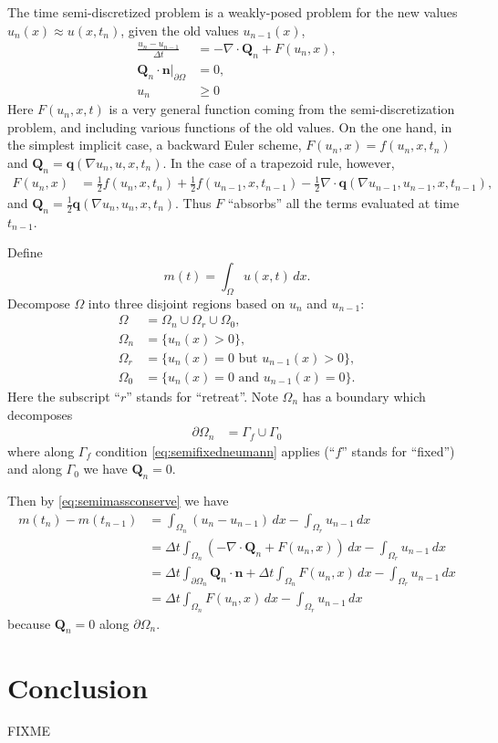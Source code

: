 \documentclass[final,leqno,onefignum,onetabnum]{siamltex1213bueler}
\newcommand\bn{\mathbf{n}}
\newcommand\bq{\mathbf{q}}
\newcommand\bQ{\mathbf{Q}}
\newcommand{\Div}{\nabla\cdot}
\renewcommand{\grad}{\nabla}
\begin{document}
The time semi-discretized problem is a weakly-posed problem for the new values $u_n(x) \approx u(x,t_n)$, given the old values $u_{n-1}(x)$,
\begin{align}
\frac{u_n - u_{n-1}}{\Delta t} &= - \Div \bQ_n + F(u_n,x), \label{eq:semimassconserve} \\
\bQ_n \cdot \bn \Big|_{\partial\Omega} &= 0, \label{eq:semifixedneumann} \\
u_n &\ge 0 \label{eq:semiconstraint}
\end{align}
Here $F(u_n,x,t)$ is a very general function coming from the semi-discretization problem, and including various functions of the old values.  On the one hand, in the simplest implicit case, a backward Euler scheme, $F(u_n,x) = f(u_n,x,t_n)$ and $\bQ_n = \bq(\grad u_n,u,x,t_n)$.  In the case of a trapezoid rule, however,
\begin{align*}
F(u_n,x) &= \frac{1}{2} f(u_n,x,t_n) + \frac{1}{2} f(u_{n-1},x,t_{n-1}) - \frac{1}{2} \Div \bq(\grad u_{n-1},u_{n-1},x,t_{n-1}),
\end{align*}
and $\bQ_n = \frac{1}{2} \bq(\grad u_n,u_n,x,t_n)$.  Thus $F$ ``absorbs'' all the terms evaluated at time $t_{n-1}$.

Define
\begin{equation}
m(t) = \int_\Omega u(x,t)\,dx.
\end{equation}
Decompose $\Omega$ into three disjoint regions based on $u_n$ and $u_{n-1}$:
\begin{align*}
\Omega &= \Omega_n \cup \Omega_r \cup \Omega_0, \\
\Omega_n &= \{u_n(x)>0\}, \\
\Omega_r &= \{u_n(x)=0 \text{ but } u_{n-1}(x) > 0\}, \\
\Omega_0 &= \{u_n(x)=0 \text{ and } u_{n-1}(x) = 0\}.
\end{align*}
Here the subscript ``$r$'' stands for ``retreat''.  Note $\Omega_n$ has a boundary which decomposes
\begin{align*}
\partial\Omega_n &= \Gamma_f \cup \Gamma_0
\end{align*}
where along $\Gamma_f$ condition \eqref{eq:semifixedneumann} applies (``$f$'' stands for ``fixed'') and along $\Gamma_0$ we have $\bQ_n = 0$.

Then by \eqref{eq:semimassconserve} we have
\begin{align*}
m(t_{n}) - m(t_{n-1}) &= \int_{\Omega_n} (u_n - u_{n-1})\,dx - \int_{\Omega_r} u_{n-1}\,dx \\
   &= \Delta t \int_{\Omega_n} (- \Div \bQ_n + F(u_n,x)) \,dx - \int_{\Omega_r} u_{n-1}\,dx \\
   &= \Delta t \int_{\partial\Omega_n} \bQ_n \cdot \bn + \Delta t \int_{\Omega_n} F(u_n,x)\,dx - \int_{\Omega_r} u_{n-1}\,dx \\
   &= \Delta t \int_{\Omega_n} F(u_n,x)\,dx - \int_{\Omega_r} u_{n-1}\,dx
\end{align*}
because $\bQ_n=0$ along $\partial\Omega_n$.



\section{Conclusion}  FIXME





\end{document}
